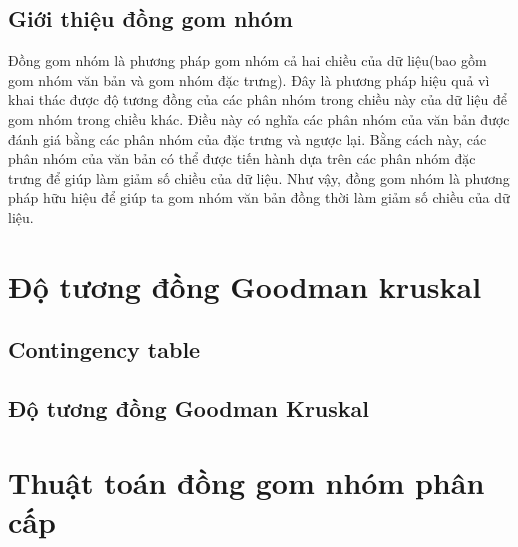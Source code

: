 	\subsection{Giới thiệu đồng gom nhóm}
	Đồng gom nhóm là phương pháp gom nhóm cả hai chiều của dữ liệu(bao gồm gom nhóm văn bản và gom nhóm đặc trưng).
	Đây là phương pháp hiệu quả vì khai thác được độ tương đồng của các phân nhóm trong chiều này của dữ liệu để gom nhóm trong chiều khác.
	Điều này có nghĩa các phân nhóm của văn bản được đánh giá bằng các phân nhóm của đặc trưng và ngược lại.
	Bằng cách này, các phân nhóm của văn bản có thể được tiến hành dựa trên các phân nhóm đặc trưng để giúp làm giảm số chiều của dữ liệu.
	Như vậy, đồng gom nhóm là phương pháp hữu hiệu để giúp ta gom nhóm văn bản đồng thời làm giảm số chiều của dữ liệu.


\section{Độ tương đồng Goodman kruskal}

	\subsection{Contingency table}
	
	\subsection{Độ tương đồng Goodman Kruskal}

\section{Thuật toán đồng gom nhóm phân cấp}
